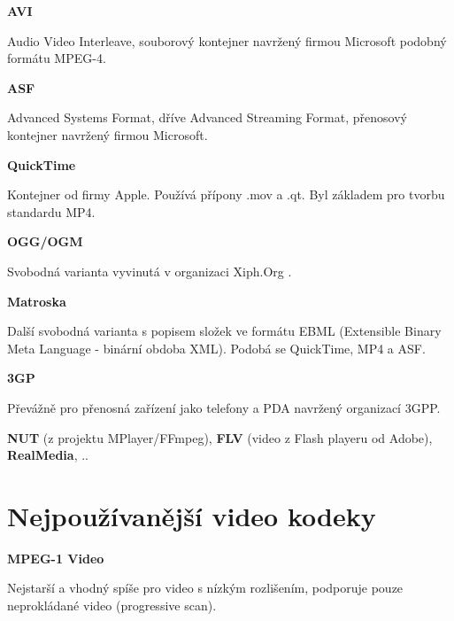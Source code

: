 \vspace{10pt}

\textbf{AVI}

Audio Video Interleave, souborový kontejner navržený firmou Microsoft podobný formátu MPEG-4.

\vspace{10pt}

\textbf{ASF} 

Advanced Systems Format, dříve Advanced Streaming Format, přenosový kontejner navržený firmou Microsoft.

\vspace{10pt}

\textbf{QuickTime}

Kontejner od firmy Apple. Používá přípony .mov a .qt. Byl základem pro tvorbu standardu MP4.

\vspace{10pt}

\textbf{OGG/OGM}

Svobodná varianta vyvinutá v organizaci Xiph.Org \cite{xiphURL}.

\vspace{10pt}

\textbf{Matroska}

Další svobodná varianta s popisem složek ve formátu EBML (Extensible Binary Meta Language - binární obdoba XML). Podobá se QuickTime, MP4 a ASF.

\vspace{10pt}

\textbf{3GP}

Převážně pro přenosná zařízení jako telefony a PDA navržený organizací 3GPP.

\vspace{10pt}

\textbf{NUT} (z projektu MPlayer/FFmpeg), \textbf{FLV} (video z Flash playeru od Adobe), \textbf{RealMedia}, ..

\vspace{10pt}

\section{Nejpoužívanější video kodeky}

\vspace{10pt}

\textbf{MPEG-1 Video}

Nejstarší a vhodný spíše pro video s nízkým rozlišením, podporuje pouze neprokládané video (progressive scan).


